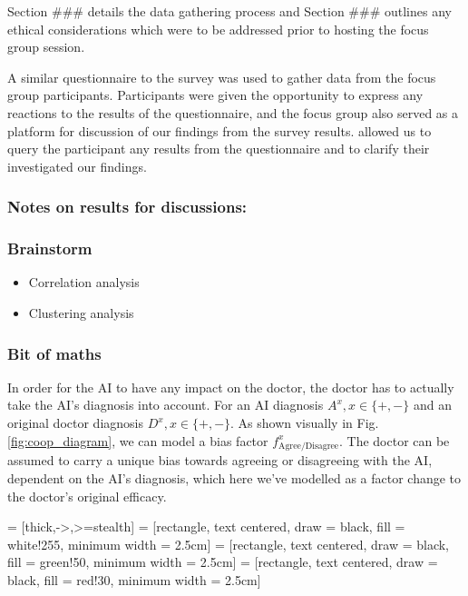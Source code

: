 \documentclass[manuscript,screen,review]{acmart}
\begin{document}
Section ### details the data gathering process and Section ### outlines any ethical considerations which were to be addressed prior to hosting the focus group session.


A similar questionnaire to the survey was used to gather data from the focus group participants. Participants were given the opportunity to express any reactions to the results of the questionnaire, and the focus group also served as a platform for discussion of our findings from the survey results. allowed us to query the participant any results from the questionnaire and to clarify their  investigated our findings.

 



\subsubsection{Notes on results for discussions:}








\subsubsection{Brainstorm}
\begin{itemize}
    \item Correlation analysis
    \item Clustering analysis
\end{itemize}




\subsubsection{Bit of maths}

In order for the AI to have any impact on the doctor, the doctor has to actually take the AI's diagnosis into account. For an AI diagnosis $A^x, x\in \{+,- \}$ and an original doctor diagnosis $D^x, x\in \{+,- \}$. As shown visually in Fig. \ref{fig:coop_diagram}, we can model a bias factor $f^x_{\textrm{Agree/Disagree}}$. The doctor can be assumed to carry a unique bias towards agreeing or disagreeing with the AI, dependent on the AI's diagnosis, which here we've modelled as a factor change to the doctor's original efficacy.

 = [thick,->,>=stealth]
 = [rectangle, text centered, draw = black, fill = white!255, minimum width = 2.5cm]
 = [rectangle, text centered, draw = black, fill = green!50, minimum width = 2.5cm]
 = [rectangle, text centered, draw = black, fill = red!30, minimum width = 2.5cm]
\end{document}
